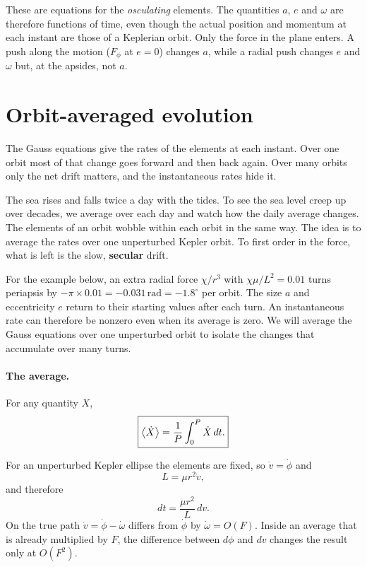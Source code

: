 	These are equations for the \emph{osculating} elements. The quantities $a$, $e$ and $\omega$ are therefore functions of time, even though the actual position and momentum at each instant are those of a Keplerian orbit. Only the force in the plane enters. A push along the motion ($F_\phi$ at $e=0$) changes $a$, while a radial push changes $e$ and $\omega$ but, at the apsides, not $a$.
	
	\section{Orbit-averaged evolution}
	\label{tb:sec:averaged}
	
	The Gauss equations give the rates of the elements at each instant. 	Over one orbit most of that change goes forward and then back again. Over many orbits only the net drift matters, and the instantaneous rates hide it.

	The sea rises and falls twice a day with the tides. To see the sea level creep up over decades, we average over each day and watch how the daily average changes. 	The elements of an orbit wobble within each orbit in the same way. The idea is to average the rates over one unperturbed Kepler orbit. To first order in the force, what is left is the slow, \textbf{secular} drift.

	For the example below, an extra radial force $\chi/r^3$ with $\chi\mu/L^2=0.01$ turns periapsis by $-\pi\times0.01=-0.031\,\mathrm{rad}=-1.8^\circ$ per orbit. The size $a$ and eccentricity $e$ return to their starting values after each turn. An instantaneous rate can therefore be nonzero even when its average is zero. We will average the Gauss equations over one unperturbed orbit to isolate the changes that accumulate over many turns.

	\paragraph{The average.} For any quantity $X$,
	\begin{equation}
		\boxed{
			\left\langle \dot X\right\rangle
			=
			\frac{1}{P}\int_0^P\dot X\,dt .
		}
		\label{eq:orbit_average}
	\end{equation}
	
	For an unperturbed Kepler ellipse the elements are fixed, so $\dot v=\dot\phi$ and
	\begin{equation}
		L=\mu r^2\dot v,
	\end{equation}
	and therefore
	\begin{equation}
		\boxed{
			dt=\frac{\mu r^2}{L}\,dv.
		}
		\label{eq:dt_df}
	\end{equation}
	On the true path $\dot v=\dot\phi-\dot\omega$ differs from $\dot\phi$ by $\dot\omega=O(F)$. Inside an average that is already multiplied by $F$, the difference between $d\phi$ and $dv$ changes the result only at $O(F^2)$.
	
